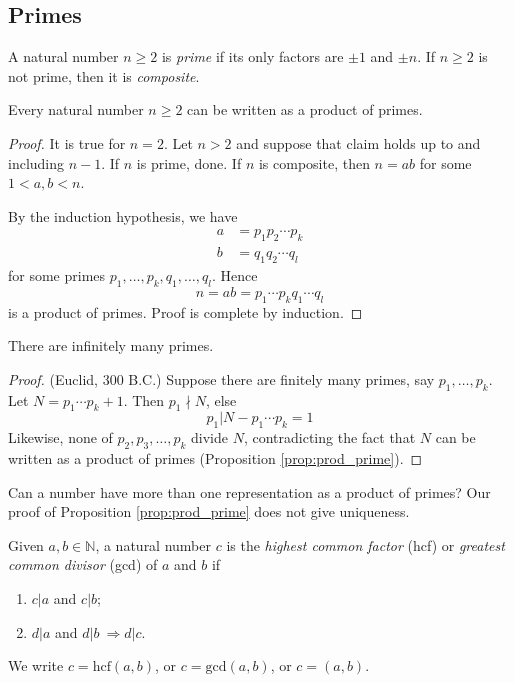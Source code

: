 \documentclass[10pt, a4paper, twoside]{report}
\begin{document}
\subsection{Primes}
\begin{definition}
    A natural number \(n\geq 2\) is \emph{prime} if its only factors are \(\pm 1\) and \(\pm n\). If \(n\geq 2\) is not prime, then it is \emph{composite}.
\end{definition}
\begin{proposition}
    Every natural number \(n\geq 2\) can be written as a product of primes.
    \label{prop:prod_prime}
\end{proposition}
\begin{proof}
    It is true for \(n=2\). Let \(n>2\) and suppose that claim holds up to and including \(n-1\). If \(n\) is prime, done. If \(n\) is composite, then \(n=ab\) for some \(1<a,b<n\).

    By the induction hypothesis, we have
    \begin{align*}
        a&=p_1p_2\cdots p_k \\
        b&=q_1q_2\cdots q_l
    \end{align*}
    for some primes \(p_1,\ldots,p_k,q_1,\ldots,q_l\). Hence
    \[n=ab=p_1\cdots p_kq_1\cdots q_l\]
    is a product of primes. Proof is complete by induction.
\end{proof}
\begin{theorem}
    There are infinitely many primes.
    \label{thm:infty_prime}
\end{theorem}
\begin{proof}
    (Euclid, 300 B.C.) Suppose there are finitely many primes, say \(p_1,\ldots,p_k\). Let \(N=p_1\cdots p_k+1\). Then \(p_1\nmid N\), else
    \[p_1|N-p_1\cdots p_k=1\]
    Likewise, none of \(p_2,p_3,\ldots,p_k\) divide \(N\), contradicting the fact that \(N\) can be written as a product of primes (Proposition \ref{prop:prod_prime}).
\end{proof}
Can a number have more than one representation as a product of primes? Our proof of Proposition \ref{prop:prod_prime} does not give uniqueness. 
\begin{definition}
    Given \(a,b\in\mathbb{N}\), a natural number \(c\) is the \emph{highest common factor} (hcf) or \emph{greatest common divisor} (gcd) of \(a\) and \(b\) if
    \begin{enumerate}
        \item \(c|a\) and \(c|b\);
        \item \(d|a\) and \(d|b\:\Rightarrow d|c\).
    \end{enumerate}
    We write \(c=\text{hcf}(a,b)\), or \(c=\text{gcd}(a,b)\), or \(c=(a,b)\).
    \label{def:gcd}
\end{definition}
\end{document}
